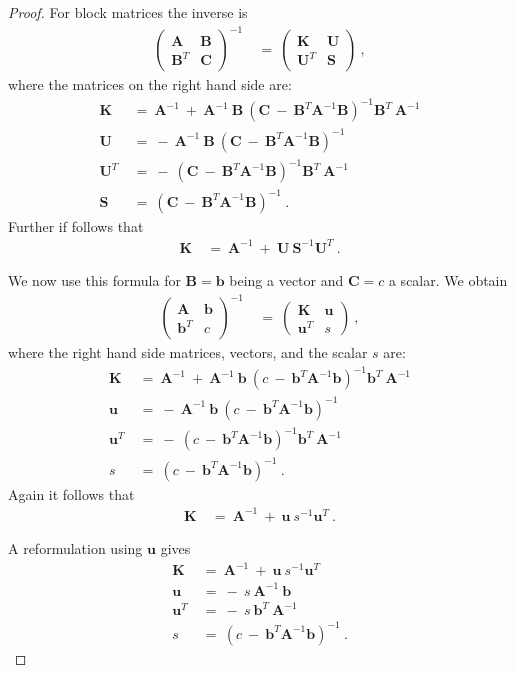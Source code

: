 \documentclass{article}
\newcommand\Bb{\bm{b}}
\newcommand\Bu{\bm{u}}
\newcommand\BA{\bm{A}}
\newcommand\BB{\bm{B}}
\newcommand\BC{\bm{C}}
\newcommand\BK{\bm{K}}
\newcommand\BS{\bm{S}}
\newcommand\BU{\bm{U}}
\begin{document}
\begin{proof}

For block matrices the inverse is
\begin{align}
\begin{pmatrix}
\BA & \BB \\
\BB^T & \BC
\end{pmatrix}^{-1} \ &= \
\begin{pmatrix}
\BK & \BU \\
\BU^T & \BS
\end{pmatrix} \ ,
\end{align}
where the matrices on the right hand side are:
\begin{align}
\BK \ &= \ \BA^{-1}  \ + \  \BA^{-1} \ \BB \ \left( \BC \ - \ \BB^T\BA^{-1} \BB
\right)^{-1} \BB^T \ \BA^{-1} \\
\BU \ &= \ - \  \BA^{-1} \ \BB \ \left( \BC \ - \ \BB^T\BA^{-1} \BB
\right)^{-1} \\
\BU^T \ &= \ - \ \left( \BC \ - \ \BB^T\BA^{-1} \BB
\right)^{-1}  \BB^T \ \BA^{-1} \\
\BS \ &= \ \left( \BC \ - \ \BB^T\BA^{-1} \BB
\right)^{-1} \ .
\end{align}
Further if follows that
\begin{align}
\BK   \ &= \ \BA^{-1} \ + \ \BU \ \BS^{-1} \BU^T \ .
\end{align}

We now use this formula for
$\BB=\Bb$ being a vector and $\BC=c$ a scalar.
We obtain
\begin{align}
\begin{pmatrix}
\BA & \Bb \\
\Bb^T & c
\end{pmatrix}^{-1} \ &= \
\begin{pmatrix}
\BK & \Bu \\
\Bu^T & s
\end{pmatrix} \ ,
\end{align}
where the right hand side matrices, vectors, and the scalar $s$ are:
\begin{align}
\BK \ &= \ \BA^{-1}  \ + \  \BA^{-1} \ \Bb \ \left( c \ - \ \Bb^T\BA^{-1} \Bb
\right)^{-1} \Bb^T \ \BA^{-1} \\
\Bu \ &= \ - \  \BA^{-1} \ \Bb \ \left( c \ - \ \Bb^T\BA^{-1} \Bb
\right)^{-1} \\
\Bu^T \ &= \ - \ \left( c \ - \ \Bb^T\BA^{-1} \Bb
\right)^{-1}  \Bb^T \ \BA^{-1} \\
s \ &= \ \left( c \ - \ \Bb^T\BA^{-1} \Bb
\right)^{-1} \ .
\end{align}
Again it follows that
\begin{align}
\BK   \ &= \ \BA^{-1} \ + \ \Bu \ s^{-1} \Bu^T \ .
\end{align}

A reformulation using $\Bu$ gives
\begin{align}
\BK \ &= \ \BA^{-1}  \ + \  \Bu \ s^{-1} \Bu^T \\
\Bu \ &= \ - \  s \ \BA^{-1} \ \Bb \\
\Bu^T \ &= \ - \ s \ \Bb^T \ \BA^{-1} \\
s \ &= \ \left( c \ - \ \Bb^T\BA^{-1} \Bb \right)^{-1} \ .
\end{align}
\end{proof}
\end{document}
